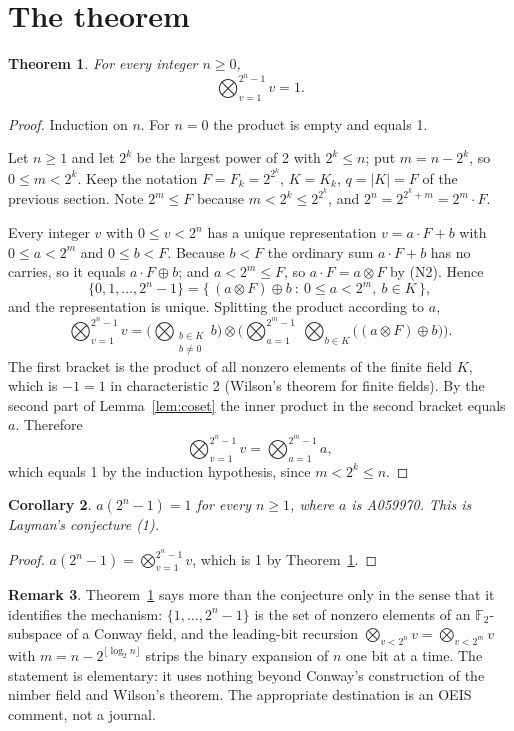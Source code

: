 \documentclass[11pt,a4paper]{article}
\theoremstyle{plain}
\newtheorem{theorem}{Theorem}
\newtheorem{corollary}[theorem]{Corollary}
\theoremstyle{definition}
\newtheorem{remark}[theorem]{Remark}
\begin{document}
\section{The theorem}

\begin{theorem}\label{thm:main}
For every integer $n\ge0$,
\[
  \bigotimes_{v=1}^{2^{n}-1}v=1.
\]
\end{theorem}

\begin{proof}
Induction on $n$. For $n=0$ the product is empty and equals 1.

Let $n\ge1$ and let $2^{k}$ be the largest power of 2 with $2^{k}\le n$; put $m=n-2^{k}$,
so $0\le m<2^{k}$. Keep the notation $F=F_{k}=2^{2^{k}}$, $K=K_{k}$, $q=|K|=F$ of the
previous section. Note $2^{m}\le F$ because $m<2^{k}\le2^{2^{k}}$, and
$2^{n}=2^{2^{k}+m}=2^{m}\cdot F$.

Every integer $v$ with $0\le v<2^{n}$ has a unique representation $v=a\cdot F+b$ with
$0\le a<2^{m}$ and $0\le b<F$. Because $b<F$ the ordinary sum $a\cdot F+b$ has no carries,
so it equals $a\cdot F\oplus b$; and $a<2^{m}\le F$, so $a\cdot F=a\otimes F$ by (N2).
Hence
\[
  \{0,1,\dots,2^{n}-1\}=\bigl\{\,(a\otimes F)\oplus b\ :\ 0\le a<2^{m},\ b\in K\,\bigr\},
\]
and the representation is unique. Splitting the product according to $a$,
\[
  \bigotimes_{v=1}^{2^{n}-1}v
  =\Biggl(\bigotimes_{\substack{b\in K\\ b\ne0}}b\Biggr)\otimes
   \Biggl(\bigotimes_{a=1}^{2^{m}-1}\ \bigotimes_{b\in K}
   \bigl((a\otimes F)\oplus b\bigr)\Biggr).
\]
The first bracket is the product of all nonzero elements of the finite field $K$, which is
$-1=1$ in characteristic 2 (Wilson's theorem for finite fields). By the second part of
Lemma~\ref{lem:coset} the inner product in the second bracket equals $a$. Therefore
\[
  \bigotimes_{v=1}^{2^{n}-1}v=\bigotimes_{a=1}^{2^{m}-1}a,
\]
which equals 1 by the induction hypothesis, since $m<2^{k}\le n$.
\end{proof}

\begin{corollary}
$a(2^{n}-1)=1$ for every $n\ge1$, where $a$ is A059970. This is Layman's conjecture (1).
\end{corollary}

\begin{proof}
$a(2^{n}-1)=\bigotimes_{v=1}^{2^{n}-1}v$, which is 1 by Theorem~\ref{thm:main}.
\end{proof}

\begin{remark}
Theorem~\ref{thm:main} says more than the conjecture only in the sense that it identifies
the mechanism: $\{1,\dots,2^{n}-1\}$ is the set of nonzero elements of an
$\mathbb{F}_{2}$-subspace of a Conway field, and the leading-bit recursion
$\bigotimes_{v<2^{n}}v=\bigotimes_{v<2^{m}}v$ with $m=n-2^{\lfloor\log_{2}n\rfloor}$ strips
the binary expansion of $n$ one bit at a time. The statement is elementary: it uses nothing
beyond Conway's construction of the nimber field and Wilson's theorem. The appropriate
destination is an OEIS comment, not a journal.
\end{remark}
\end{document}
